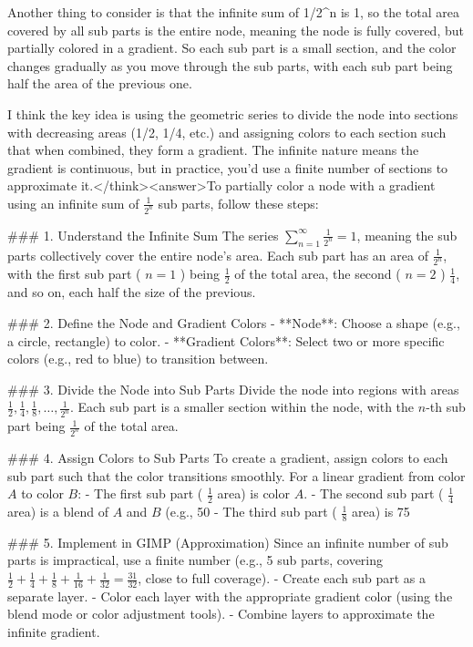 Another thing to consider is that the infinite sum of 1/2^n is 1, so the total area covered by all sub parts is the entire node, meaning the node is fully covered, but partially colored in a gradient. So each sub part is a small section, and the color changes gradually as you move through the sub parts, with each sub part being half the area of the previous one. 

I think the key idea is using the geometric series to divide the node into sections with decreasing areas (1/2, 1/4, etc.) and assigning colors to each section such that when combined, they form a gradient. The infinite nature means the gradient is continuous, but in practice, you'd use a finite number of sections to approximate it.</think><answer>To partially color a node with a gradient using an infinite sum of \( \frac{1}{2^n} \) sub parts, follow these steps:  

### 1. Understand the Infinite Sum  
The series \( \sum_{n=1}^{\infty} \frac{1}{2^n} = 1 \), meaning the sub parts collectively cover the entire node’s area. Each sub part has an area of \( \frac{1}{2^n} \), with the first sub part ( \( n=1 \) ) being \( \frac{1}{2} \) of the total area, the second ( \( n=2 \) ) \( \frac{1}{4} \), and so on, each half the size of the previous.  

### 2. Define the Node and Gradient Colors  
- **Node**: Choose a shape (e.g., a circle, rectangle) to color.  
- **Gradient Colors**: Select two or more specific colors (e.g., red to blue) to transition between.  

### 3. Divide the Node into Sub Parts  
Divide the node into regions with areas \( \frac{1}{2}, \frac{1}{4}, \frac{1}{8}, \dots, \frac{1}{2^n} \). Each sub part is a smaller section within the node, with the \( n \)-th sub part being \( \frac{1}{2^n} \) of the total area.  

### 4. Assign Colors to Sub Parts  
To create a gradient, assign colors to each sub part such that the color transitions smoothly. For a linear gradient from color \( A \) to color \( B \):  
- The first sub part ( \( \frac{1}{2} \) area) is color \( A \).  
- The second sub part ( \( \frac{1}{4} \) area) is a blend of \( A \) and \( B \) (e.g., 50%
- The third sub part ( \( \frac{1}{8} \) area) is 75%

### 5. Implement in GIMP (Approximation)  
Since an infinite number of sub parts is impractical, use a finite number (e.g., 5 sub parts, covering \( \frac{1}{2} + \frac{1}{4} + \frac{1}{8} + \frac{1}{16} + \frac{1}{32} = \frac{31}{32} \), close to full coverage).  
- Create each sub part as a separate layer.  
- Color each layer with the appropriate gradient color (using the blend mode or color adjustment tools).  
- Combine layers to approximate the infinite gradient.  

